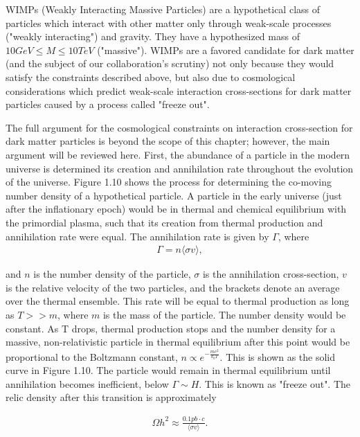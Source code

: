 \documentclass{report}
\begin{document}
WIMPs (Weakly Interacting Massive Particles) are a hypothetical class of particles which interact with other matter only through weak-scale processes ("weakly interacting") and gravity. They have a hypothesized mass of $10GeV \leq M \leq 10TeV$ ("massive"). WIMPs are a favored candidate for dark matter (and the subject of our collaboration's scrutiny) not only because they would satisfy the constraints described above, but also due to cosmological considerations which predict weak-scale interaction cross-sections for dark matter particles caused by a process called "freeze out".

The full argument for the cosmological constraints on interaction cross-section for dark matter particles is beyond the scope of this chapter; however, the main argument will be reviewed here. First, the abundance of a particle in the modern universe is determined its creation and annihilation rate throughout the evolution of the universe. Figure 1.10 shows the process for determining the co-moving number density of a hypothetical particle. A particle in the early universe (just after the inflationary epoch) would be in thermal and chemical equilibrium with the primordial plasma, such that its creation from thermal production and annihilation rate were equal. The annihilation rate is given by $\Gamma$, where
\begin{eqnarray}
\Gamma = n\langle \sigma v \rangle ,
\end{eqnarray}

and $n$ is the number density of the particle, $\sigma$ is the annihilation cross-section, $v$ is the relative velocity of the two particles, and the brackets denote an average over the thermal ensemble. This rate will be equal to thermal production as long as $T >> m$, where $m$ is the mass of the particle. The number density would be constant. As T drops, thermal production stops and the number density for a massive, non-relativistic particle in thermal equilibrium after this point would be proportional to the Boltzmann constant, $n \propto e^{-\frac{mc^2}{k_bT}}$. This is shown as the solid curve in Figure 1.10. The particle would remain in thermal equilibrium until annihilation becomes inefficient, below $\Gamma \sim H$. This is known as "freeze out". The relic density after this transition is approximately \cite{Jungman1996}

\begin{eqnarray}
\Omega h^2 \approx \frac{0.1pb \cdot c}{\langle \sigma v \rangle} .
\end{eqnarray}
\end{document}
